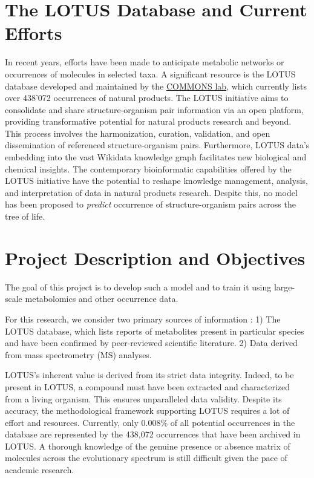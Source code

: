\documentclass[
11pt, %
oneside, %
english, %
singlespacing, %
headsepline, %
chapterinoneline, %
]{MastersDoctoralThesis} %
\begin{document}
\section{The LOTUS Database and Current Efforts}
In recent years, efforts have been made to anticipate metabolic networks or occurrences of molecules in selected taxa. A significant resource is the LOTUS database \cite{rutzLOTUSInitiativeOpen2022} developed and maintained by the \href{https://www.unifr.ch/bio/en/groups/allard/}{COMMONS lab}, which currently lists over 438'072 occurrences of natural products. The LOTUS initiative aims to consolidate and share structure-organism pair information via an open platform, providing transformative potential for natural products research and beyond. This process involves the harmonization, curation, validation, and open dissemination of referenced structure-organism pairs. Furthermore, LOTUS data's embedding into the vast Wikidata knowledge graph facilitates new biological and chemical insights. The contemporary bioinformatic capabilities offered by the LOTUS initiative have the potential to reshape knowledge management, analysis, and interpretation of data in natural products research. Despite this, no model has been proposed to \textit{predict} occurrence of structure-organism pairs across the tree of life.

\section{Project Description and Objectives}
The goal of this project is to develop such a model and to train it using large-scale metabolomics and other occurrence data.

For this research, we consider two primary sources of information : 1) The LOTUS database, which lists reports of metabolites present in particular species and have been confirmed by peer-reviewed scientific literature. 2) Data derived from mass spectrometry (MS) analyses.

LOTUS's inherent value is derived from its strict data integrity. Indeed, to be present in LOTUS, a compound must have been extracted and characterized from a living organism. This ensures unparalleled data validity. Despite its accuracy, the methodological framework supporting LOTUS requires a lot of effort and resources. Currently, only 0.008\% of all potential occurrences in the database are represented by the 438,072 occurrences that have been archived in LOTUS. A thorough knowledge of the genuine presence or absence matrix of molecules across the evolutionary spectrum is still difficult given the pace of academic research.
\end{document}
